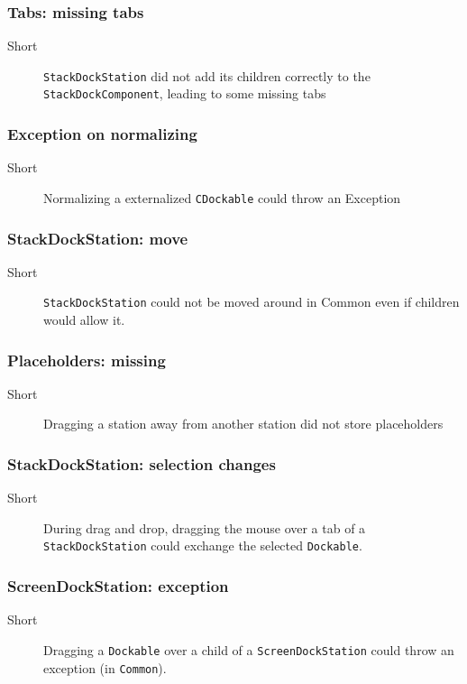 \documentclass[a4paper,10pt]{article}
\newcommand{\src}[1]{\lstinline[basicstyle=\normalsize\ttfamily,keywordstyle=\normalsize\ttfamily,identifierstyle=\normalsize\ttfamily]|#1|}
\newcommand{\short}{\item[Short]}
\begin{document}
\subsubsection{Tabs: missing tabs}
\begin{description}
 \short \src{StackDockStation} did not add its children correctly to the \linebreak \src{StackDockComponent}, leading to some missing tabs
\end{description}

\subsubsection{Exception on normalizing}
\begin{description}
 \short Normalizing a externalized \src{CDockable} could throw an Exception
\end{description}


\subsubsection{StackDockStation: move}
\begin{description}
 \short \src{StackDockStation} could not be moved around in Common even if children would allow it.
\end{description}

\subsubsection{Placeholders: missing}
\begin{description}
 \short Dragging a station away from another station did not store placeholders
\end{description}

\subsubsection{StackDockStation: selection changes}
\begin{description}
 \short During drag and drop, dragging the mouse over a tab of a \linebreak \src{StackDockStation} could exchange the selected \src{Dockable}.
\end{description}

\subsubsection{ScreenDockStation: exception}
\begin{description}
 \short Dragging a \src{Dockable} over a child of a \src{ScreenDockStation} could throw an exception (in \src{Common}).
\end{description}
\end{document}
